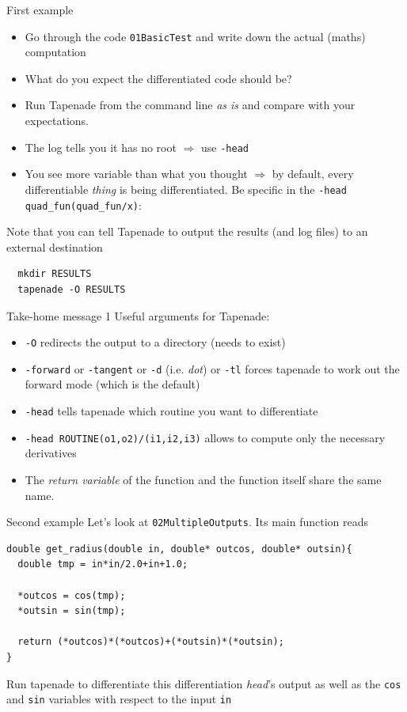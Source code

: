 \documentclass[12pt,xcolor={table}]{beamer}
\begin{document}
\begin{frame}[fragile]{First example}
  \begin{itemize}
    \item Go through the code \texttt{01BasicTest} and write down the actual (maths) computation
    \item What do you expect the differentiated code should be?
    \item Run Tapenade from the command line \emph{as is} and compare with your expectations.
    \pause
    \item The log tells you it has no root $\Rightarrow$ use \texttt{-head}
    \item You see more variable than what you thought $\Rightarrow$ by default, every differentiable \emph{thing} is being differentiated. Be specific in the \texttt{-head quad\_fun(quad\_fun/x)}: 
  \end{itemize}

  Note that you can tell Tapenade to output the results (and log files) to an external destination
  \begin{lstlisting}
  mkdir RESULTS
  tapenade -O RESULTS
  \end{lstlisting}

\end{frame}

\begin{frame}{Take-home message 1}
  Useful arguments for Tapenade: 
  \begin{itemize}
    \item \texttt{-O} redirects the output to a directory (needs to exist)
    \item \texttt{-forward} or \texttt{-tangent} or \texttt{-d} (i.e. \emph{dot}) or \texttt{-tl} forces tapenade to work out the forward mode (which is the default)
    \item \texttt{-head} tells tapenade which routine you want to differentiate
    \item \texttt{-head ROUTINE(o1,o2)/(i1,i2,i3)} allows to compute only the necessary derivatives
    \item The \emph{return variable} of the function and the function itself share the same name.
  \end{itemize}
\end{frame}

\begin{frame}[fragile]{Second example}
  Let's look at \texttt{02MultipleOutputs}. Its main function reads 
  \begin{lstlisting}
double get_radius(double in, double* outcos, double* outsin){
  double tmp = in*in/2.0+in+1.0;

  *outcos = cos(tmp);
  *outsin = sin(tmp);

  return (*outcos)*(*outcos)+(*outsin)*(*outsin);
}
  \end{lstlisting}

  Run tapenade to differentiate this differentiation \emph{head}'s output as well as the \texttt{cos} and \texttt{sin} variables with respect to the input \texttt{in}
  

\end{frame}
\end{document}
